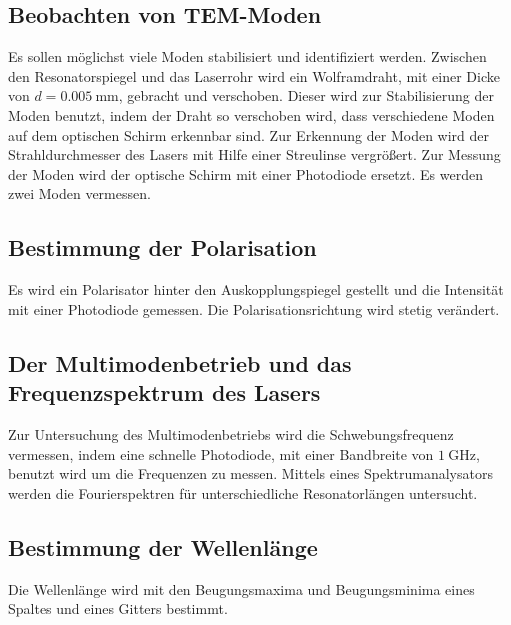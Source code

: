 \subsection{Beobachten von TEM-Moden}
\label{subsec:Moden}
Es sollen möglichst viele Moden stabilisiert und identifiziert werden. Zwischen den Resonatorspiegel und das Laserrohr
wird ein Wolframdraht, mit einer Dicke von $d = \qty{0.005}{\milli\meter}$, gebracht und verschoben. Dieser wird zur Stabilisierung
der Moden benutzt, indem der Draht so verschoben wird, dass verschiedene Moden auf dem optischen Schirm erkennbar sind.
Zur Erkennung der Moden wird der Strahldurchmesser des Lasers mit Hilfe einer Streulinse vergrößert. Zur Messung der Moden wird der optische Schirm mit 
einer Photodiode ersetzt. Es werden zwei Moden vermessen.

\subsection{Bestimmung der Polarisation}
\label{subsec:Polarisation}
Es wird ein Polarisator hinter den Auskopplungspiegel gestellt und die Intensität mit einer Photodiode gemessen.
Die Polarisationsrichtung wird stetig verändert.

\subsection{Der Multimodenbetrieb und das Frequenzspektrum des Lasers}
\label{subsec:Multimodenbetrieb}
Zur Untersuchung des Multimodenbetriebs wird die Schwebungsfrequenz vermessen, indem eine schnelle Photodiode, mit einer Bandbreite
von $\qty{1}{\giga\Hz}$, benutzt wird um die Frequenzen zu messen. Mittels eines Spektrumanalysators werden die Fourierspektren für 
unterschiedliche Resonatorlängen untersucht.

\subsection{Bestimmung der Wellenlänge}
\label{subsec:Wellenlänge}
Die Wellenlänge wird mit den Beugungsmaxima und Beugungsminima eines Spaltes und eines Gitters bestimmt.